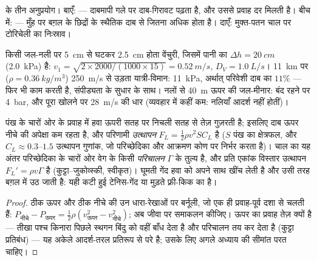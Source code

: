 \begin{omfigure}
{\small {} के तीन अनुप्रयोग। बाएँ:  --- दाबमापी गले पर दाब-गिरावट पढ़ता है, और उससे
प्रवाह दर मिलती है। बीच में:  --- मुँह पर  बग़ल के
छिद्रों के स्थैतिक दाब से  जितना
अधिक होता है। दाएँ: मुक्त-पतन चाल पर टोरिचेली का निःस्राव।}
\end{omfigure}

\begin{example}[अंक]\label{ex:b2:euler-bernoulli:numbers}
किसी जल-नली पर \qty{5}{cm} से घटकर \qty{2.5}{cm} होता वेंचुरी, जिसमें
पानी का $\Delta h = \qty{20}{cm}$ (\qty{2.0}{kPa}) है: $v_1 = \sqrt{2 \times 2000/
(1000 \times 15)} = \qty{0.52}{m/s}$, $D_V = \qty{1.0}{L/s}$। \qty{11}{km} पर
($\rho = \qty{0.36}{kg/m^3}$) \qty{250}{m/s} से उड़ता यात्री-विमान: 
\qty{11}{kPa}, अर्थात् परिवेशी दाब का $11\%$ ---  फिर भी
काम करती है, संपीड्यता के सुधार के साथ। नलों से \qty{40}{m} ऊपर की
जल-मीनार: बंद रहने पर \qty{4}{bar}, और पूरा खोलने पर \qty{28}{m/s} की धार
(व्यवहार में कहीं कम: नलियाँ आदर्श नहीं होतीं)।
\end{example}

\begin{proposition}[पंख पर उत्थापन]\label{prop:b2:euler-bernoulli:lift}
पंख के चारों ओर के प्रवाह में हवा ऊपरी सतह पर निचली सतह से तेज़
गुज़रती है; इसलिए दाब ऊपर नीचे की अपेक्षा कम रहता है, और परिणामी
\emph{उत्थापन} $F_L =
\tfrac12\rho v^2SC_L$ है ($S$ पंख का क्षेत्रफल, और $C_L \approx 0.3$--$1.5$
उत्थापन गुणांक, जो परिच्छेदिका और आक्रमण कोण पर निर्भर करता है)।
चाल का यह अंतर परिच्छेदिका के चारों ओर वेग के किसी \emph{परिचालन}
$\Gamma$ के तुल्य है, और प्रति एकांक विस्तार उत्थापन $F_L' =
\rho v\Gamma$ है (कुट्टा--जुकोव्स्की, स्वीकृत)। घूमती गेंद हवा को अपने
साथ खींच लेती है और उसी तरह बग़ल में उठ जाती है: यही कटी हुई टेनिस-गेंद
या मुड़ते फ़्री-किक का \emph{} है।
\end{proposition}

\begin{proof}
ठीक ऊपर और ठीक नीचे की उन धारा-रेखाओं पर बर्नूली, जो एक ही
प्रवाह-पूर्व दशा से चलती हैं: $P_{\text{नीचे}} - P_{\text{ऊपर}} = \tfrac12\rho
(v_{\text{ऊपर}}^2 - v_{\text{नीचे}}^2)$; अब जीवा पर समाकलन कीजिए। ऊपर का प्रवाह
तेज़ क्यों है --- तीखा पश्च किनारा पिछले स्थगन बिंदु को वहीं बाँध देता
है और परिचालन तय कर देता है (कुट्टा प्रतिबंध)
--- यह अकेले आदर्श-तरल प्रतिरूप से परे है; उसके लिए अगले अध्याय की
सीमांत परत चाहिए।
\end{proof}

